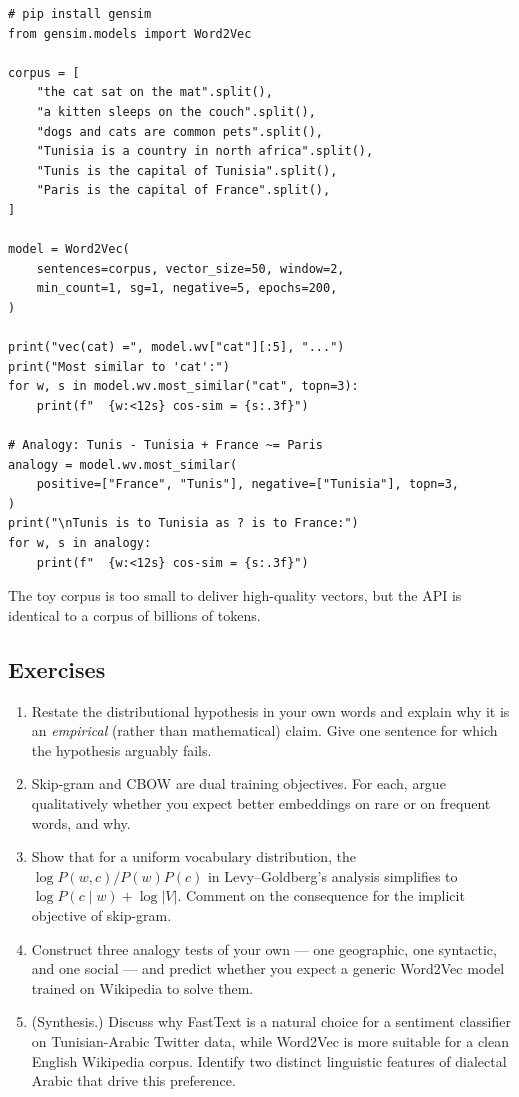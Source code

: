 \documentclass[12pt,a4paper]{report}
\theoremstyle{definition}
\theoremstyle{remark}
\begin{document}
\begin{lstlisting}
# pip install gensim
from gensim.models import Word2Vec

corpus = [
    "the cat sat on the mat".split(),
    "a kitten sleeps on the couch".split(),
    "dogs and cats are common pets".split(),
    "Tunisia is a country in north africa".split(),
    "Tunis is the capital of Tunisia".split(),
    "Paris is the capital of France".split(),
]

model = Word2Vec(
    sentences=corpus, vector_size=50, window=2,
    min_count=1, sg=1, negative=5, epochs=200,
)

print("vec(cat) =", model.wv["cat"][:5], "...")
print("Most similar to 'cat':")
for w, s in model.wv.most_similar("cat", topn=3):
    print(f"  {w:<12s} cos-sim = {s:.3f}")

# Analogy: Tunis - Tunisia + France ~= Paris
analogy = model.wv.most_similar(
    positive=["France", "Tunis"], negative=["Tunisia"], topn=3,
)
print("\nTunis is to Tunisia as ? is to France:")
for w, s in analogy:
    print(f"  {w:<12s} cos-sim = {s:.3f}")
\end{lstlisting}

The toy corpus is too small to deliver high-quality vectors, but the API is identical to a corpus of billions of tokens.

\subsection{Exercises}
\begin{enumerate}
    \item Restate the distributional hypothesis in your own words and explain why it is an \emph{empirical} (rather than mathematical) claim. Give one sentence for which the hypothesis arguably fails.
    \item Skip-gram and CBOW are dual training objectives. For each, argue qualitatively whether you expect better embeddings on rare or on frequent words, and why.
    \item Show that for a uniform vocabulary distribution, the $\log P(w, c)/P(w)P(c)$ in Levy--Goldberg's analysis simplifies to $\log P(c \mid w) + \log |V|$. Comment on the consequence for the implicit objective of skip-gram.
    \item Construct three analogy tests of your own --- one geographic, one syntactic, and one social --- and predict whether you expect a generic Word2Vec model trained on Wikipedia to solve them.
    \item (Synthesis.) Discuss why FastText is a natural choice for a sentiment classifier on Tunisian-Arabic Twitter data, while Word2Vec is more suitable for a clean English Wikipedia corpus. Identify two distinct linguistic features of dialectal Arabic that drive this preference.
\end{enumerate}
\end{document}
